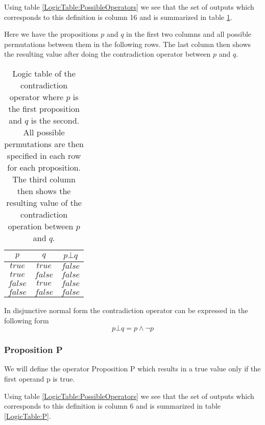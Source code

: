         Using table \ref{LogicTable:PossibleOperators} we see that the set of outputs which corresponds to this definition is column 16 and is summarized in table \ref{LogicTable:contradiction}.
        
        Here we have the propositions $p$ and $q$ in the first two columns and all possible permutations between them in the following rows. The last column then shows the resulting value after doing the contradiction operator between $p$ and $q$.
        
        \begin{table}[h!]
            \centering
            \begin{tabular}{|c|c|c|}
            	\hline
            	  $p$   &   $q$   & $p \bot q$ \\ \hline
            	$true$  & $true$  &  $false$   \\ \hline
            	$true$  & $false$ &  $false$   \\ \hline
            	$false$ & $true$  &  $false$   \\ \hline
            	$false$ & $false$ &  $false$   \\ \hline
            \end{tabular}
            \caption{Logic table of the contradiction operator where $p$ is the first proposition and $q$ is the second. All possible permutations are then specified in each row for each proposition. The third column then shows the resulting value of the contradiction operation between $p$ and $q$.}
            \label{LogicTable:contradiction}
        \end{table}
        
        In disjunctive normal form the contradiction operator can be expressed in the following form
        \begin{equation}
            p \bot q = p \wedge \neg p
        \end{equation}
    
    \subsubsection{Proposition P}
        We will define the operator Proposition P which results in a true value only if the first operand p is true.
        
        Using table \ref{LogicTable:PossibleOperators} we see that the set of outputs which corresponds to this definition is column 6 and is summarized in table \ref{LogicTable:P}.
        
